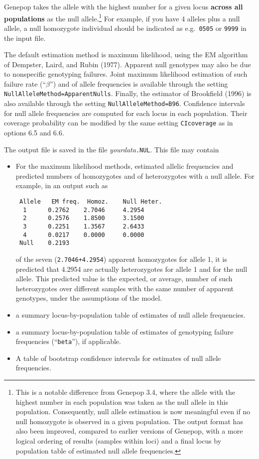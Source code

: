 \documentclass[
  12pt,
]{book}
\begin{document}
Genepop takes the allele with the highest number for a given locus \textbf{across all populations} as the null allele.\footnote{This is a notable difference from Genepop 3.4, where the allele with the highest number in each population was taken as the null allele in this population. Consequently, null allele estimation is now meaningful even if no null homozygote is observed in a given population. The output format has also been improved, compared to earlier versions of Genepop, with a more logical ordering of results (samples within loci) and a final locus by population table of estimated null allele frequencies.} For example, if you have 4 alleles plus a null allele, a null homozygote individual should be indicated as e.g.~\texttt{0505} or \texttt{9999} in the input file.

The default estimation method is maximum likelihood, using the EM algorithm of Dempster, Laird, and Rubin (1977). Apparent null genotypes may also be due to nonspecific genotyping failures. Joint maximum likelihood estimation of such failure rate (``\(\beta\)'') and of allele frequencies is available through the setting \texttt{NullAlleleMethod=ApparentNulls}. Finally, the estimator of Brookfield (1996) is also available through the setting \texttt{NullAlleleMethod=B96}. Confidence intervals for null allele frequencies are computed for each locus in each population. Their coverage probability can be modified by the same setting \texttt{CIcoverage} as in options 6.5 and 6.6.

The output file is saved in the file \emph{yourdata}\texttt{.NUL}. This file may contain

\begin{itemize}
\item
  For the maximum likelihood methods, estimated allelic frequencies and predicted numbers of homozygotes and of heterozygotes with a null allele. For example, in an output such as

\begin{verbatim}
 Allele   EM freq.  Homoz.    Null Heter.
  1      0.2762    2.7046     4.2954
  2      0.2576    1.8500     3.1500
  3      0.2251    1.3567     2.6433
  4      0.0217    0.0000     0.0000
 Null    0.2193
\end{verbatim}

  of the seven (\texttt{2.7046+4.2954}) apparent homozygotes for allele 1, it is predicted that 4.2954 are actually heterozygotes for allele 1 and for the null allele. This predicted value is the expected, or average, number of such heterozygotes over different samples with the same number of apparent genotypes, under the assumptions of the model.
\item
  a summary locus-by-population table of estimates of null allele frequencies.
\item
  a summary locus-by-population table of estimates of genotyping failure frequencies (``\texttt{beta}''), if applicable.
\item
  A table of bootstrap confidence intervals for estimates of null allele frequencies.
\end{itemize}
\end{document}
